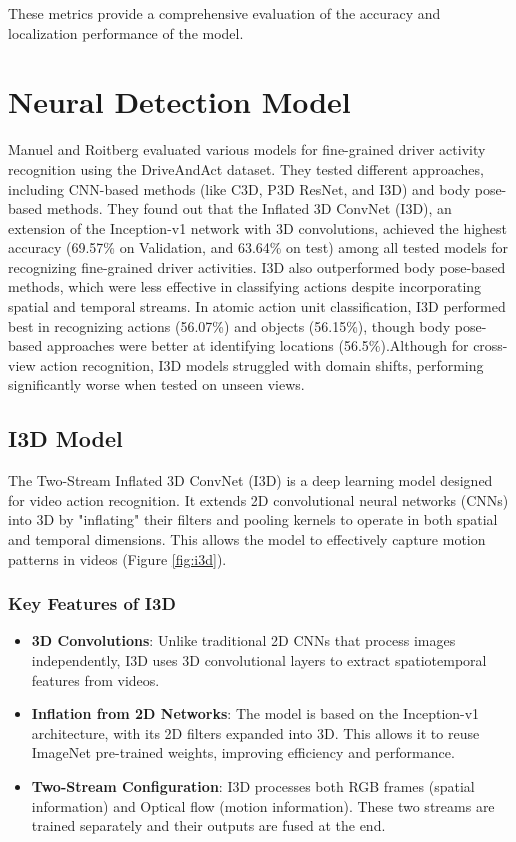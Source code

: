\documentclass{article}
\begin{document}
These metrics provide a comprehensive evaluation of the accuracy and localization performance of the model.

\section{Neural Detection Model}
Manuel and Roitberg \cite{drive_and_act_2019_iccv} evaluated various models for fine-grained driver activity recognition using the DriveAndAct dataset. They tested different approaches, including CNN-based methods (like C3D, P3D ResNet, and I3D) and body pose-based methods. They found out that the Inflated 3D ConvNet (I3D), an extension of the Inception-v1 network with 3D convolutions, achieved the highest accuracy (69.57\% on Validation, and 63.64\% on test) among all tested models for recognizing fine-grained driver activities.
I3D also outperformed body pose-based methods, which were less effective in classifying actions despite incorporating spatial and temporal streams.
In atomic action unit classification, I3D performed best in recognizing actions (56.07\%) and objects (56.15\%), though body pose-based approaches were better at identifying locations (56.5\%).Although for cross-view action recognition, I3D models struggled with domain shifts, performing significantly worse when tested on unseen views.
\subsection{I3D Model}
The Two-Stream Inflated 3D ConvNet (I3D) \cite{carreira2018quovadisactionrecognition} is a deep learning model designed for video action recognition. It extends 2D convolutional neural networks (CNNs) into 3D by "inflating" their filters and pooling kernels to operate in both spatial and temporal dimensions. This allows the model to effectively capture motion patterns in videos (Figure \ref{fig:i3d}).
\subsubsection{Key Features of I3D}
\begin{itemize}
    \item \textbf{3D Convolutions}: Unlike traditional 2D CNNs that process images independently, I3D uses 3D convolutional layers to extract spatiotemporal features from videos.
    \item \textbf{Inflation from 2D Networks}: The model is based on the Inception-v1 architecture, with its 2D filters expanded into 3D. This allows it to reuse ImageNet pre-trained weights, improving efficiency and performance.
    \item \textbf{Two-Stream Configuration}: I3D processes both RGB frames (spatial information) and Optical flow (motion information). These two streams are trained separately and their outputs are fused at the end.
\end{itemize}
\end{document}
